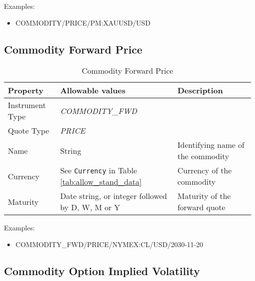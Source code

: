 \medskip
Examples:
\begin{itemize}
    \item {COMMODITY/PRICE/PM:XAUUSD/USD}
\end{itemize}
\subsection{Commodity Forward Price}

\begin{table}[H]
    \centering
    \begin{tabular}{|p{3cm}|p{4.5cm}|p{7cm}|}
        \hline
        {\bf Property} & {\bf Allowable values} & {\bf Description} \\ \hline
        Instrument Type & \emph{COMMODITY\_FWD} & \\ \hline
        Quote Type & \emph{PRICE} & \\ \hline
        Name & String & Identifying name of the commodity \\ \hline
        Currency & See \lstinline!Currency! in Table \ref{tab:allow_stand_data}&  Currency of the commodity \\ \hline
        Maturity & Date string, or integer followed by D, W, M or Y & Maturity of the forward quote \\ \hline
    \end{tabular}
    \caption{Commodity Forward Price}
    \label{tab:comfwd_quote}
\end{table}

\medskip
Examples:
\begin{itemize}
    \item {COMMODITY\_FWD/PRICE/NYMEX:CL/USD/2030-11-20}
\end{itemize}

\subsection{Commodity Option Implied Volatility}
\label{md:commodity_option_iv}

